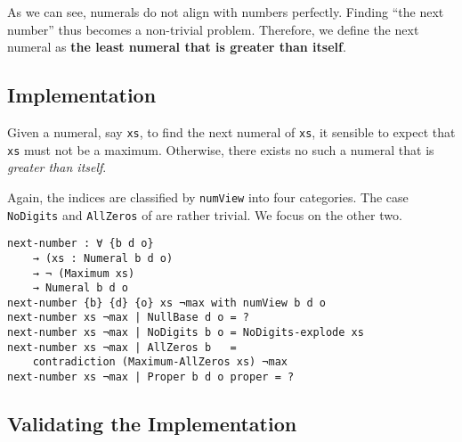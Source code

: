 \documentclass[\main/thesis.tex]{subfiles}
\begin{document}
\begin{center}
    \begin{adjustbox}{max width=\textwidth}
    \end{adjustbox}
\end{center}

As we can see, numerals do not align with numbers perfectly.
Finding ``the next number'' thus becomes a non-trivial problem.
Therefore, we define the next numeral as \textbf{the least numeral that is greater than itself}.

\subsection{Implementation}

Given a numeral, say {\lstinline|xs|}, to find the next numeral of {\lstinline|xs|},
it sensible to expect that {\lstinline|xs|} must not be a maximum.
Otherwise, there exists no such a numeral that is \textit{greater than itself}.

Again, the indices are classified by {\lstinline|numView|} into four categories.
The case {\lstinline|NoDigits|} and {\lstinline|AllZeros|} of are rather trivial.
We focus on the other two.

\begin{lstlisting}
next-number : ∀ {b d o}
    → (xs : Numeral b d o)
    → ¬ (Maximum xs)
    → Numeral b d o
next-number {b} {d} {o} xs ¬max with numView b d o
next-number xs ¬max | NullBase d o = ?
next-number xs ¬max | NoDigits b o = NoDigits-explode xs
next-number xs ¬max | AllZeros b   =
    contradiction (Maximum-AllZeros xs) ¬max
next-number xs ¬max | Proper b d o proper = ?
\end{lstlisting}

\subsection{Validating the Implementation}
\end{document}

